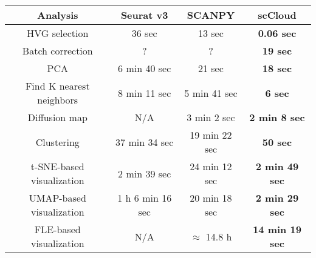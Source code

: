 \documentclass[10pt]{article}
\begin{document}
\begin{table}[H]
	\centering
	\begin{tabular}{|c|c|c|c|}
		\hline
		Analysis & Seurat v3 & SCANPY & scCloud\\
		\hline \hline
		HVG selection & 36 sec & 13 sec & \textbf{0.06 sec} \\
		\hline
		Batch correction & ? & ? & \textbf{19 sec} \\
		\hline
		PCA & 6 min 40 sec & 21 sec & \textbf{18 sec} \\
		\hline
		Find K nearest neighbors & 8 min 11 sec &  5 min 41 sec & \textbf{6 sec}\\
		\hline
		Diffusion map & N/A & 3 min 2 sec & \textbf{2 min 8 sec} \\
		\hline 
		Clustering & 37 min 34 sec & 19 min 22 sec & \textbf{50 sec}\\
		\hline
		t-SNE-based visualization & 2 min 39 sec & 24 min 12 sec & \textbf{2 min 49 sec}\\
		\hline
		UMAP-based visualization & 1 h 6 min 16 sec & 20 min 18 sec & \textbf{2 min 29 sec}\\
		\hline
		FLE-based visualization & N/A & $\approx$ 14.8  h & \textbf{14 min 19 sec}\\
		\hline
	\end{tabular}
\end{table}
\end{document}
